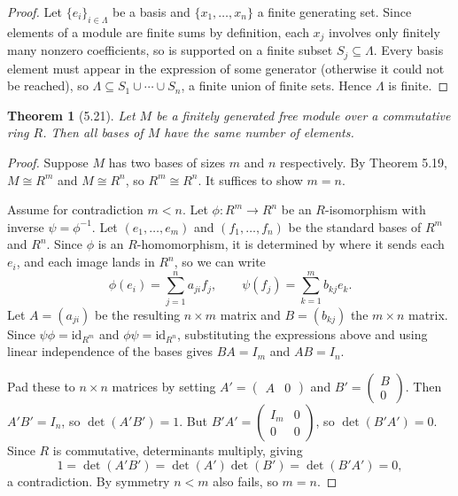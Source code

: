 \documentclass[12pt]{article}
\newtheorem{theorem}{Theorem}
\begin{document}
\begin{proof}
Let $\{e_i\}_{i \in \Lambda}$ be a basis and $\{x_1, \ldots, x_n\}$ a finite generating set. Since elements of a module are finite sums by definition, each $x_j$ involves only finitely many nonzero coefficients, so is supported on a finite subset $S_j \subseteq \Lambda$. Every basis element must appear in the expression of some generator (otherwise it could not be reached), so $\Lambda \subseteq S_1 \cup \cdots \cup S_n$, a finite union of finite sets. Hence $\Lambda$ is finite.
\end{proof}

\begin{theorem}[5.21]
Let $M$ be a finitely generated free module over a commutative ring $R$. Then all bases of $M$ have the same number of elements.
\end{theorem}

\begin{proof}
Suppose $M$ has two bases of sizes $m$ and $n$ respectively. By Theorem 5.19, $M \cong R^m$ and $M \cong R^n$, so $R^m \cong R^n$. It suffices to show $m = n$.

Assume for contradiction $m < n$. Let $\phi : R^m \to R^n$ be an $R$-isomorphism with inverse $\psi = \phi^{-1}$. Let $(e_1,\ldots,e_m)$ and $(f_1,\ldots,f_n)$ be the standard bases of $R^m$ and $R^n$. Since $\phi$ is an $R$-homomorphism, it is determined by where it sends each $e_i$, and each image lands in $R^n$, so we can write
\[
  \phi(e_i) = \sum_{j=1}^n a_{ji} f_j, \qquad \psi(f_j) = \sum_{k=1}^m b_{kj} e_k.
\]
Let $A = (a_{ji})$ be the resulting $n \times m$ matrix and $B = (b_{kj})$ the $m \times n$ matrix. Since $\psi\phi = \mathrm{id}_{R^m}$ and $\phi\psi = \mathrm{id}_{R^n}$, substituting the expressions above and using linear independence of the bases gives $BA = I_m$ and $AB = I_n$.

Pad these to $n \times n$ matrices by setting $A' = \begin{pmatrix} A & 0 \end{pmatrix}$ and $B' = \begin{pmatrix} B \\ 0 \end{pmatrix}$. Then $A'B' = I_n$, so $\det(A'B') = 1$. But $B'A' = \begin{pmatrix} I_m & 0 \\ 0 & 0 \end{pmatrix}$, so $\det(B'A') = 0$. Since $R$ is commutative, determinants multiply, giving
\[
  1 = \det(A'B') = \det(A')\det(B') = \det(B'A') = 0,
\]
a contradiction. By symmetry $n < m$ also fails, so $m = n$.
\end{proof}
\end{document}
